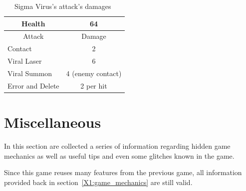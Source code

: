 \begin{table}[htp]
	\centering
	\begin{tabular}[h]{l c}
		\toprule
		\multicolumn{1}{c}{Health}  & 64\\
		\midrule
		\multicolumn{1}{c}{Attack} & \multicolumn{1}{c}{Damage}\\
		Contact & 2 \\
		Viral Laser & 6\\
		Viral Summon & 4 (enemy contact)\\
		Error and Delete & 2 per hit\\
		\bottomrule
	\end{tabular}
	\caption{Sigma Virus's attack's damages~\cite{wiki:Neo_sigma}}
\end{table}

\section{Miscellaneous}\label{X2:misc} %
In this section are collected a series of information regarding hidden game mechanics as well as useful tips and even some glitches known in the game. 

Since this game reuses many features from the previous game, all information provided back in section~\ref{X1:game_mechanics} are still valid.

